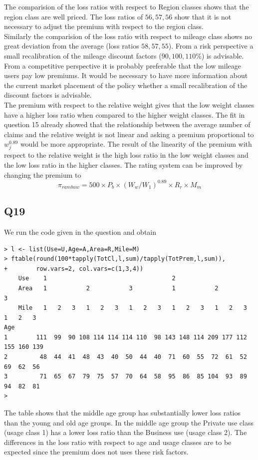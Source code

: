 \documentclass[11pt]{article}
\begin{document}
The comparision of the loss ratios with respect to Region classes shows that the region class are well priced. The loss ratios of $56,57,56$ show that it is not necessary to adjust the premium with respect to the region class. \\

Similarly the comparision of the loss ratio with respect to mileage class shows no great deviation from the average (loss ratios $58,57,55$). From a risk perspective a small recalibration of the mileage discount factors ($90, 100, 110 \%$) is advisable. From a competitive perspective it is probably preferable that the low mileage users pay low premiums. It would be necessary to have more information about the current market placement of the policy whether a small recalibration of the discount factors is advisable. \\

The premium with respect to the relative weight gives that the low weight classes have a higher loss ratio when compared to the higher weight classes. The fit in question 15 already showed that the relationship between the average number of claims and the relative weight is not linear and asking a premium proportional to $w_j^{0.89}$ would be more appropriate. The result of the linearity of the premium with respect to the relative weight is the high loss ratio in the low weight classes and the low loss ratio in the higher classes. The rating system can be improved by changing the premium to 
\begin{equation}
\pi_{rambuw} = 500 \times P_b \times (W_w / W_1)^{0.89} \times R_r \times M_m
\end{equation}

\subsection*{Q19}
We run the code given in the question and obtain
\begin{verbatim}
> l <- list(Use=U,Age=A,Area=R,Mile=M)
> ftable(round(100*tapply(TotCl,l,sum)/tapply(TotPrem,l,sum)),
+        row.vars=2, col.vars=c(1,3,4))
    Use    1                                   2                                
    Area   1           2           3           1           2           3        
    Mile   1   2   3   1   2   3   1   2   3   1   2   3   1   2   3   1   2   3
Age                                                                             
1        111  99  90 108 114 114 114 110  98 143 148 114 209 177 112 155 160 139
2         48  44  41  48  43  40  50  44  40  71  60  55  72  61  52  69  62  56
3         71  65  67  79  75  57  70  64  58  95  86  85 104  93  89  94  82  81
>
\end{verbatim}
The table shows that the middle age group has substantially lower loss ratios than the young and old age groups. In the middle age group the Private use class (usage class 1) has a lower loss ratio than the Business use (usage class 2). The differences in the loss ratio with respect to age and usage classes are to be expected since the premium does not uses these risk factors. \\
\end{document}
